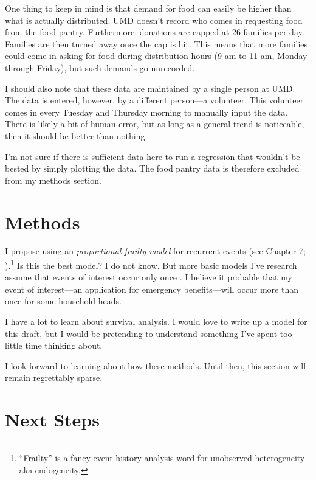 \documentclass[12pt,letterpaperpaper,]{book}
\begin{document}
One thing to keep in mind is that demand for food can easily be higher
than what is actually distributed. UMD doesn't record who comes in
requesting food from the food pantry. Furthermore, donations are capped
at 26 families per day. Families are then turned away once the cap is
hit. This means that more families could come in asking for food during
distribution hours (9 am to 11 am, Monday through Friday), but such
demands go unrecorded.

I should also note that these data are maintained by a single person at
UMD. The data is entered, however, by a different person---a volunteer.
This volunteer comes in every Tuesday and Thursday morning to manually
input the data. There is likely a bit of human error, but as long as a
general trend is noticeable, then it should be better than nothing.

I'm not sure if there is sufficient data here to run a regression that
wouldn't be bested by simply plotting the data. The food pantry data is
therefore excluded from my methods section.

\hypertarget{methods-3}{\section*{Methods}\label{methods-3}}

I propose using an \emph{proportional frailty model} for recurrent
events (see Chapter 7; \citet{aalen_survival_2008}).\footnote{``Frailty''
  is a fancy event history analysis word for unobserved heterogeneity
  aka endogeneity.} Is this the best model? I do not know. But more
basic models I've research assume that events of interest occur only
once \citep{singer_applied_2003}. I believe it probable that my event of
interest---an application for emergency benefits---will occur more than
once for some household heads.

I have a lot to learn about survival analysis. I would love to write up
a model for this draft, but I would be pretending to understand
something I've spent too little time thinking about.

I look forward to learning about how these methods. Until then, this
section will remain regrettably sparse.

\section*{Next Steps}\label{next-steps-1}
\end{document}
